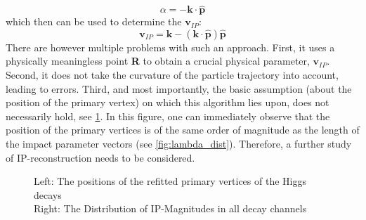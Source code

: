 \begin{equation}
	\alpha = -\boldsymbol{k}\cdot\boldsymbol{\hat{p}}
\end{equation}
which then can be used to determine the $\boldsymbol{v}_{IP}$:
\begin{equation}
	\boldsymbol{v}_{IP} = \boldsymbol{k}-(\boldsymbol{k}\cdot\boldsymbol{\hat{p}})\boldsymbol{\hat{p}}
\end{equation}
There are however multiple problems with such an approach. First, it uses a physically meaningless point \textbf{R} to obtain a crucial physical parameter, $\boldsymbol{v}_{IP}$. Second, it does not take the curvature of the particle trajectory into account, leading to errors. Third, and most importantly, the basic assumption (about the position of the primary vertex) on which this algorithm lies upon, does not necessarily hold, see \ref{fig:PVs}. In this figure, one can immediately observe that the position of the primary vertices is of the same order of magnitude as the length of the impact parameter vectors (see \ref{fig:lambda_dist}). Therefore, a further study of IP-reconstruction needs to be considered.\\
\begin{figure}[h]
	\centering
	\caption{Left: The positions of the refitted primary vertices of the Higgs decays\\Right: The Distribution of IP-Magnitudes in all decay channels}
	\label{fig:PVs}
\end{figure}
\newpage
